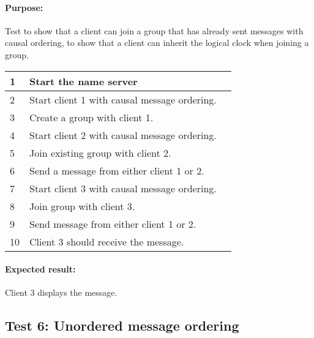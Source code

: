 \paragraph{Purpose: } Test to show that a client can join a group that has already sent messages with causal ordering,
to show that a client can inherit the logical clock when joining a group.
\begin{table}[h!]
	\begin{tabularx}{\textwidth}{|l|X|p{8pt}|}
		\hline
		1 & Start the name server & \\
		\hline
		2 & Start client 1 with causal message ordering. & \\
		\hline
		3 & Create a group with client 1. & \\
		\hline
		4 & Start client   2 with causal message ordering. & \\
		\hline
		5 & Join existing group with client 2.& \\
		\hline
		6 & Send a message from either client 1 or 2. & \\
		\hline
		7 & Start client   3 with causal message ordering. & \\
		\hline		
		8 & Join group with client 3. & \\
		\hline		
		9 & Send message from either client 1 or 2. & \\
		\hline		
		10 & Client 3 should receive the message. & \\
		\hline		
	\end{tabularx}
\end{table}

\paragraph{Expected result:} Client 3 displays the message.


\subsection*{Test 6: Unordered message ordering}
